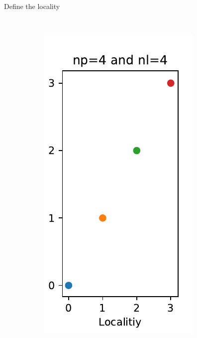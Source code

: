 \documentclass[12pt,t]{beamer}
\begin{document}
\begin{frame}[fragile]{Define the locality}
\begin{figure}
\begin{subfigure}[b]{0.3\textwidth}
    \end{subfigure}
    ~ %
    \begin{subfigure}[b]{0.3\textwidth}
        \includegraphics[width=\textwidth]{./images/partition3}
    \end{subfigure}
\end{figure}

\end{frame}
\end{document}

